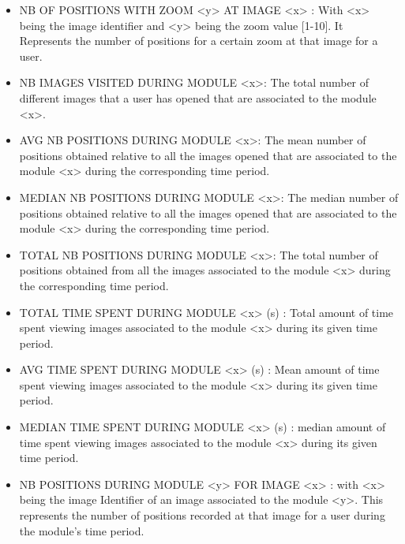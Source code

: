 \documentclass[a4paper,11pt]{report}
\numberwithin{figure}{section} %
\begin{document}
\begin{itemize}
    \item[\textbullet] NB OF POSITIONS WITH ZOOM <y> AT IMAGE <x> : With <x> being the image identifier and <y> being the zoom value [1-10].
    It Represents the number of positions for a certain zoom  at that image for a user. \\

    \item[\textbullet] NB IMAGES VISITED DURING MODULE <x>: The total number of different images that a user has opened that are associated to the module <x>.\\
    
    \item[\textbullet] AVG NB POSITIONS DURING MODULE <x>: The mean number of positions obtained relative to all the images opened that are associated to the module <x> during the corresponding time period.\\
    
    \item[\textbullet] MEDIAN NB POSITIONS DURING MODULE <x>: The median number of positions obtained relative to all the images opened that are associated to the module <x> during the corresponding time period.\\
    
    \item[\textbullet] TOTAL NB POSITIONS DURING MODULE <x>: The total number of positions obtained from all the images associated to the module <x> during the corresponding time period.\\
    
    \item[\textbullet] TOTAL TIME SPENT DURING MODULE <x> (s) : Total amount of time spent viewing images associated to the module <x> during its given time period.\\    
    
    \item[\textbullet] AVG TIME SPENT DURING MODULE <x> (s) : Mean amount of time spent viewing images associated to the module <x> during its given time period.\\    
    
    \item[\textbullet] MEDIAN TIME SPENT DURING MODULE <x> (s) : median amount of time spent viewing images associated to the module <x> during its given time period.\\
    
    \item[\textbullet] NB POSITIONS DURING MODULE <y> FOR IMAGE <x> : with <x> being the image Identifier of an image associated to the module <y>.
    This represents the number of positions recorded at that image for a user during the module's time period. \\
       

\end{itemize}
\end{document}
